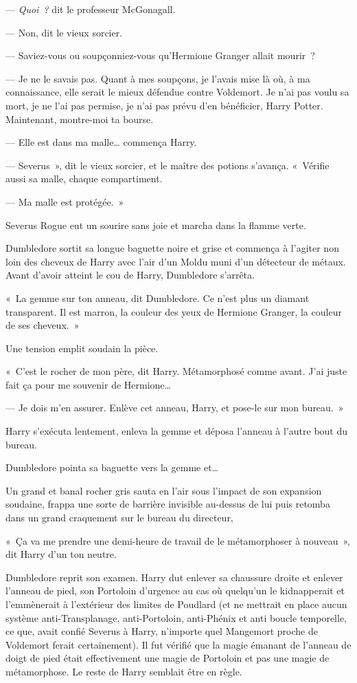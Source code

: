 --- \emph{Quoi~?} dit le professeur McGonagall.

--- Non, dit le vieux sorcier.

--- Saviez-vous ou soupçonniez-vous qu'Hermione Granger allait mourir~?

--- Je ne le savais pas.
Quant à mes soupçons, je l'avais mise là où, à ma connaissance, elle serait le mieux défendue contre Voldemort.
Je n'ai pas voulu sa mort, je ne l'ai pas permise, je n'ai pas prévu d'en bénéficier, Harry Potter.
Maintenant, montre-moi ta bourse.

--- Elle est dans ma malle… commença Harry.

--- Severus~», dit le vieux sorcier, et le maître des potions s'avança.
«~Vérifie aussi sa malle, chaque compartiment.

--- Ma malle est protégée.~»

Severus Rogue eut un sourire sans joie et marcha dans la flamme verte.

Dumbledore sortit sa longue baguette noire et grise et commença à l'agiter non loin des cheveux de Harry avec l'air d'un Moldu muni d'un détecteur de métaux.
Avant d'avoir atteint le cou de Harry, Dumbledore s'arrêta.

«~La gemme sur ton anneau, dit Dumbledore.
Ce n'est plus un diamant transparent.
Il est marron, la couleur des yeux de Hermione Granger, la couleur de ses cheveux.~»

Une tension emplit soudain la pièce.

«~C'est le rocher de mon père, dit Harry.
Métamorphosé comme avant.
J'ai juste fait ça pour me souvenir de Hermione…

--- Je dois m'en assurer.
Enlève cet anneau, Harry, et pose-le sur mon bureau.~»

Harry s'exécuta lentement, enleva la gemme et déposa l'anneau à l'autre bout du bureau.

Dumbledore pointa sa baguette vers la gemme et…

Un grand et banal rocher gris sauta en l'air sous l'impact de son expansion soudaine, frappa une sorte de barrière invisible au-dessus de lui puis retomba dans un grand craquement sur le bureau du directeur,

«~Ça va me prendre une demi-heure de travail de le métamorphoser à nouveau~», dit Harry d'un ton neutre.

Dumbledore reprit son examen.
Harry dut enlever sa chaussure droite et enlever l'anneau de pied, son Portoloin d'urgence au cas où quelqu'un le kidnapperait et l'emmènerait à l'extérieur des limites de Poudlard (et ne mettrait en place aucun système anti-Transplanage, anti-Portoloin, anti-Phénix et anti boucle temporelle, ce que, avait confié Severus à Harry, n'importe quel Mangemort proche de Voldemort ferait certainement).
Il fut vérifié que la magie émanant de l'anneau de doigt de pied était effectivement une magie de Portoloin et pas une magie de métamorphose.
Le reste de Harry semblait être en règle.

